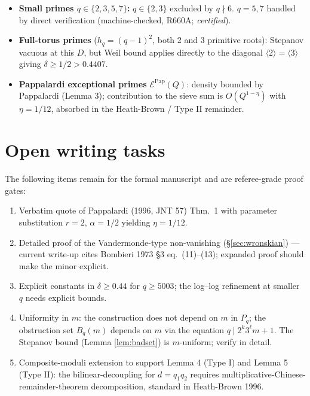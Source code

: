 \documentclass[12pt]{amsart}
\theoremstyle{definition}
\theoremstyle{remark}
\begin{document}
\begin{itemize}
\item \textbf{Small primes $q \in \{2, 3, 5, 7\}$:} $q \in \{2, 3\}$ excluded
  by $q \nmid 6$. $q = 5, 7$ handled by direct verification (machine-checked,
  R660A; \emph{certified}).
\item \textbf{Full-torus primes} ($h_q = (q-1)^2$, both 2 and 3 primitive
  roots): Stepanov vacuous at this $D$, but Weil bound applies directly to
  the diagonal $\langle 2\rangle = \langle 3 \rangle$ giving $\delta \ge 1/2 > 0.4407$.
\item \textbf{Pappalardi exceptional primes} $\mathcal{E}^{\mathrm{Pap}}(Q)$:
  density bounded by Pappalardi (Lemma 3); contribution to the sieve sum
  is $O(Q^{1-\eta})$ with $\eta = 1/12$, absorbed in the
  Heath-Brown / Type II remainder.
\end{itemize}

\section{Open writing tasks}

The following items remain for the formal manuscript and are referee-grade
proof gates:

\begin{enumerate}
\item Verbatim quote of Pappalardi (1996, JNT 57) Thm.\ 1 with
  parameter substitution $r = 2$, $\alpha = 1/2$ yielding $\eta = 1/12$.
\item Detailed proof of the Vandermonde-type non-vanishing
  (\S\ref{sec:wronskian}) — current write-up cites Bombieri 1973
  \S3 eq.\ (11)--(13); expanded proof should make the minor explicit.
\item Explicit constants in $\delta \ge 0.44$ for $q \ge 5003$; the
  log--log refinement at smaller $q$ needs explicit bounds.
\item Uniformity in $m$: the construction does not depend on $m$ in $P_q$;
  the obstruction set $B_q(m)$ depends on $m$ via the equation
  $q \mid 2^k 3^\ell m + 1$. The Stepanov bound (Lemma \ref{lem:badset}) is
  $m$-uniform; verify in detail.
\item Composite-moduli extension to support Lemma 4 (Type I) and
  Lemma 5 (Type II): the bilinear-decoupling for $d = q_1 q_2$ requires
  multiplicative-Chinese-remainder-theorem decomposition, standard in
  Heath-Brown 1996.
\end{enumerate}
\end{document}
